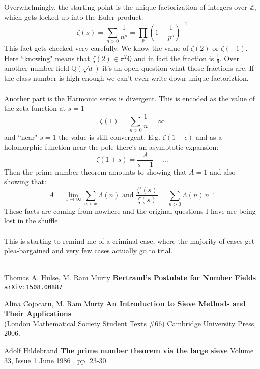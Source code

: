 \documentclass[12pt]{article}
\begin{document}
\newpage 

\noindent Overwhelmingly, the starting point is the unique factorization of integers over $\mathbb{Z}$, which gets locked up into the Euler product:
$$ \zeta(s) =  \sum_{n > 0} \frac{1}{n^s} = \prod_p \left( 1 - \frac{1}{p^s} \right)^{-1}$$
This fact gets checked very carefully.  We know the value of $\zeta(2)$ or $\zeta(-1)$.  Here ``knowing" means that $\zeta(2) \in \pi^2 \mathbb{Q}$ and in fact the fraction is $\frac{1}{6}$.  Over another number field $\mathbb{Q}(\sqrt{d})$ it's an open question what those fractions are.  If the class number is high enough we can't even write down unique factoriztion.  \\ \\
Another part is the Harmonic series is divergent.  This is encoded as the value of the zeta function at $s=1$
$$ \zeta(1) = \sum_{n > 0} \frac{1}{n} = \infty $$
and ``near" $s=1$ the value is still convergent.  E.g. $\zeta(1 + \epsilon)$ and as a holomorphic function near the pole there's an asymptotic expansion:
$$ \zeta(1 + s) = \frac{A}{s-1} + \dots  $$
Then the prime number theorem amounts to showing that $A = 1$ and also showing that:
$$ A = \lim_{x \to \infty} \sum_{n < x} \Lambda(n) \text{ and } \frac{\zeta'(s)}{\zeta(s)} = \sum_{n > 0} \Lambda(n) \, n^{-s}$$
These facts are coming from nowhere and the original questions I have are being lost in the shuffle. \\ \\
This is starting to remind me of a criminal case, where the majority of cases get plea-bargained and very few cases actually go to trial. \\ \\

\vfill
\begin{thebibliography}{}

\item Thomas A. Hulse, M. Ram Murty \textbf{Bertrand's Postulate for Number Fields} \texttt{arXiv:1508.00887}

\item Alina Cojocaru, M. Ram Murty \textbf{An Introduction to Sieve Methods and Their Applications} \\ (London Mathematical Society Student Texts \#66) Cambridge University Press, 2006.

\item Adolf Hildebrand \textbf{The prime number theorem via the large sieve} Volume 33, Issue 1 June 1986 , pp. 23-30.

\end{thebibliography}
\end{document}
